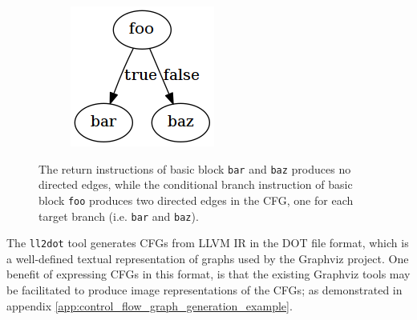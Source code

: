 \begin{figure}[htbp]
	\centering
	\begin{subfigure}[ht]{0.54\textwidth}
		
	\end{subfigure}
	\enskip
	\begin{subfigure}[ht]{0.22\textwidth}
		\includegraphics[width=\textwidth]{inc/cfg_gen_example.png}
	\end{subfigure}
	\caption{The return instructions of basic block \texttt{bar} and \texttt{baz} produces no directed edges, while the conditional branch instruction of basic block \texttt{foo} produces two directed edges in the CFG, one for each target branch (i.e. \texttt{bar} and \texttt{baz}).}
	\label{fig:cfg_gen_example}
\end{figure}

The \texttt{ll2dot} tool generates CFGs from LLVM IR in the DOT file format, which is a well-defined textual representation of graphs used by the Graphviz project. One benefit of expressing CFGs in this format, is that the existing Graphviz tools may be facilitated to produce image representations of the CFGs; as demonstrated in appendix \ref{app:control_flow_graph_generation_example}.
